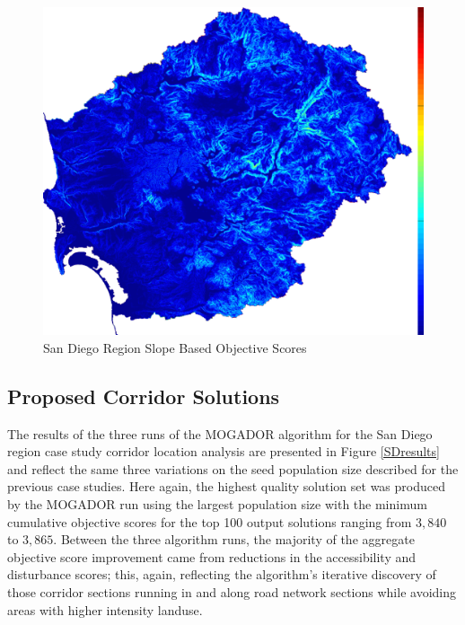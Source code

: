         \begin{figure}[!h]
            \begin{center}
            \includegraphics[width=5.5in]{figures/SanDiego_SlopeScore.png}   
            \caption{San Diego Region Slope Based Objective Scores}
            \label{fig:SDslope}
            \end{center}
        \end{figure}
        
    \subsection{Proposed Corridor Solutions}

The results of the three runs of the MOGADOR algorithm for the San Diego region case study corridor location analysis are presented in Figure \ref{SDresults} and reflect the same three variations on the seed population size described for the previous case studies. Here again, the highest quality solution set was produced by the MOGADOR run using the largest population size with the minimum cumulative objective scores for the top 100 output solutions ranging from $3,840$ to $3,865$. Between the three algorithm runs, the majority of the aggregate objective score improvement came from reductions in the accessibility and disturbance scores; this, again, reflecting the algorithm's iterative discovery of those corridor sections running in and along road network sections while avoiding areas with higher intensity landuse.

